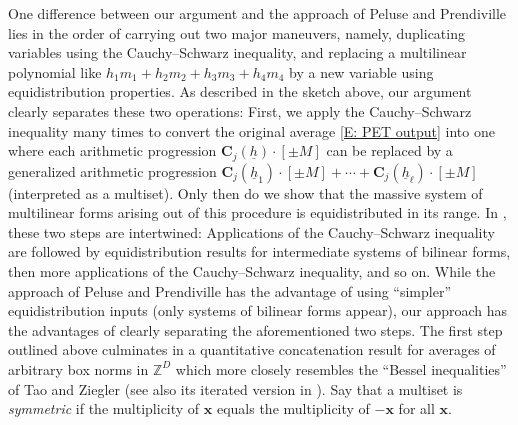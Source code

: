 \documentclass[11pt]{amsart}
\theoremstyle{definition}
\newcommand{\Z}{{\mathbb Z}}
\newcommand{\bc}{{\mathbf{C}}}
\newcommand{\bx}{{\mathbf{x}}}
\newcommand{\uh}{{\underline{h}}}
\begin{document}
One difference between our argument and the approach of Peluse and Prendiville \cite{Pel20, PP19, Pre20b} lies in the order of carrying out two major maneuvers, namely, duplicating variables using the Cauchy--Schwarz inequality, and replacing a multilinear polynomial like $h_1 m_1 + h_2 m_2 + h_3 m_3 + h_4 m_4$ by a new variable using equidistribution properties. As described in the sketch above, our argument clearly separates these two operations: First, we apply the Cauchy--Schwarz inequality many times to convert the original average \eqref{E: PET output} into one where each arithmetic progression $\bc_j(\uh)\cdot[\pm M]$ can be replaced by a generalized arithmetic progression $\bc_j(\uh_1)\cdot[\pm M] + \cdots + \bc_j(\uh_\ell)\cdot[\pm M]$ (interpreted as a multiset). Only then do we show that the massive system of multilinear forms arising out of this procedure is equidistributed in its range. In \cite{Pel20, PP19, Pre20b}, these two steps are intertwined: Applications of the Cauchy--Schwarz inequality are followed by equidistribution results for intermediate systems of bilinear forms, then more applications of the Cauchy--Schwarz inequality, and so on.  While the approach of Peluse and Prendiville has the advantage of using ``simpler'' equidistribution inputs (only systems of bilinear forms appear), our approach has the advantages of clearly separating the aforementioned two steps. The first step outlined above culminates in a quantitative concatenation result for averages of arbitrary box norms in $\Z^D$ which more closely resembles the ``Bessel inequalities'' of  Tao and Ziegler \cite{TZ16} (see also its iterated version in \cite[Corollary 3.7]{DFKS22}). Say that a multiset is \textit{symmetric} if the multiplicity of $\bx$ equals the multiplicity of $-\bx$ for all $\bx$.
\end{document}
